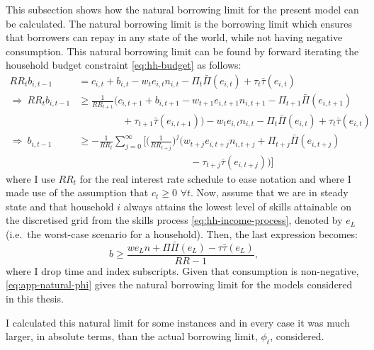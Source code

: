 \documentclass[a4paper,12pt]{article} %
\numberwithin{equation}{section} %
\numberwithin{figure}{section}
\numberwithin{table}{section}
\begin{document}
\begin{refsection}
\begin{appendices}
This subsection shows how the natural borrowing limit for the present model can be calculated. The natural borrowing limit is the borrowing limit which ensures that borrowers can repay in any state of the world, while not having negative consumption. This natural borrowing limit can be found by forward iterating the household budget constraint \eqref{eq:hh-budget} as follows:
\begin{align*}
    RR_t b_{i,t-1} &= c_{i,t} + b_{i,t} - w_t e_{i,t} n_{i,t} - \Pi_t \bar{\Pi} (e_{i,t}) + \tau_t \bar{\tau} (e_{i,t}) \\
    \Rightarrow \ RR_t b_{i,t-1} &\ge \frac{1}{RR_{t+1}} \Bigg( c_{i,t+1} + b_{i,t+1} - w_{t+1} e_{i,t+1} n_{i,t+1} - \Pi_{t+1} \bar{\Pi} (e_{i,t+1}) \\
    & \ \ \ \ \ \ \ \ \ \ \ \ \ \ \ \ \ \ \ \ + \tau_{t+1} \bar{\tau} (e_{i,t+1}) \Bigg) - w_t e_{i,t} n_{i,t} - \Pi_{t} \bar{\Pi} (e_{i,t}) + \tau_t \bar{\tau} (e_{i,t}) \\
    \Rightarrow \ b_{i,t-1} &\ge - \frac{1}{RR_t} \sum_{j=0}^{\infty} \Bigg[ \Bigg( \frac{1}{RR_{t+j}} \Bigg)^j \bigg( w_{t+j} e_{i,t+j} n_{i,t+j} + \Pi_{t+j} \bar{\Pi} (e_{i,t+j}) \\ 
    & \ \ \ \ \ \ \ \ \ \ \ \ \ \ \ \ \ \ \ \ \ \ \ \ \ \ \ \ \ \ \ \ \ \ \ \ \ \ \ \ \ \ \ \ \ \ \ \ \ \ \ - \tau_{t+j} \bar{\tau} (e_{i,t+j}) \bigg) \Bigg]
\end{align*}
where I use $RR_t$ for the real interest rate schedule to ease notation and where I made use of the assumption that $c_{t} \ge 0$ $\forall t$.  Now, assume that we are in steady state and that household $i$ always attains the lowest level of skills attainable on the discretised grid from the skills process \eqref{eq:hh-income-process}, denoted by $e_L$ (i.e.~the worst-case scenario for a household). Then, the last expression becomes: 
\begin{equation}
    b \ge \frac{we_{L}n + \Pi \bar{\Pi} (e_{L}) - \tau \bar{\tau} (e_{L})}{RR - 1}, \label{eq:app-natural-phi}
\end{equation}
where I drop time and index subscripts. Given that consumption is non-negative, \eqref{eq:app-natural-phi} gives the natural borrowing limit for the models considered in this thesis.

I calculated this natural limit for some instances and in every case it was much larger, in absolute terms, than the actual borrowing limit, $\phi_t$, considered.


\end{appendices}
\end{refsection}
\end{document}
